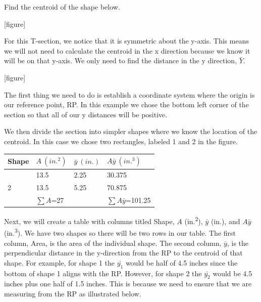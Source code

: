 \documentclass[
  letterpaper,
  DIV=11,
  numbers=noendperiod]{scrreprt}
\begin{document}
\begin{tcolorbox}[enhanced jigsaw, breakable, opacityback=0, toptitle=1mm, left=2mm, colback=white, opacitybacktitle=0.6, colframe=quarto-callout-tip-color-frame, titlerule=0mm, arc=.35mm, leftrule=.75mm, bottomtitle=1mm, colbacktitle=quarto-callout-tip-color!10!white, rightrule=.15mm, title={Example 8.1}, bottomrule=.15mm, toprule=.15mm, coltitle=black]

Find the centroid of the shape below.

{[}figure{]}

\begin{tcolorbox}[enhanced jigsaw, breakable, opacityback=0, toptitle=1mm, left=2mm, colback=white, opacitybacktitle=0.6, colframe=quarto-callout-tip-color-frame, titlerule=0mm, arc=.35mm, leftrule=.75mm, bottomtitle=1mm, colbacktitle=quarto-callout-tip-color!10!white, rightrule=.15mm, title={Solution}, bottomrule=.15mm, toprule=.15mm, coltitle=black]

For this T-section, we notice that it is symmetric about the y-axis.
This means we will not need to calculate the centroid in the x direction
because we know it will be on that y-axis. We only need to find the
distance in the y direction, \(\bar{Y}\).

{[}figure{]}

The first thing we need to do is establish a coordinate system where the
origin is our reference point, RP. In this example we chose the bottom
left corner of the section so that all of our y distances will be
positive.

We then divide the section into simpler shapes where we know the
location of the centroid. In this case we chose two rectangles, labeled
1 and 2 in the figure.

\begin{longtable}[]{@{}llll@{}}
\toprule\noalign{}
Shape & \(A{~(in.^2)}\) & \(\bar{y}{~(in.)}\) &
\(A\bar{y}{~(in.^3)}\) \\
\midrule\noalign{}
\endhead
\bottomrule\noalign{}
\endlastfoot
1 & 13.5 & 2.25 & 30.375 \\
2 & 13.5 & 5.25 & 70.875 \\
& \(\sum A\)=27 & & \(\sum A\bar{y}\)=101.25 \\
\end{longtable}

Next, we will create a table with columns titled Shape, \(A\)
(in.\textsuperscript{2}), \(\bar{y}\) (in.), and \(A\bar{y}\)
(in.\textsuperscript{3}). We have two shapes so there will be two rows
in our table. The first column, Area, is the area of the individual
shape. The second column, \(\bar{y}\), is the perpendicular distance in
the y-direction from the RP to the centroid of that shape. For example,
for shape 1 the \(\bar{y_1}\) would be half of 4.5 inches since the
bottom of shape 1 aligns with the RP. However, for shape 2 the
\(\bar{y_2}\) would be 4.5 inches plus one half of 1.5 inches. This is
because we need to ensure that we are measuring from the RP as
illustrated below.


\end{tcolorbox}
\end{tcolorbox}
\end{document}
